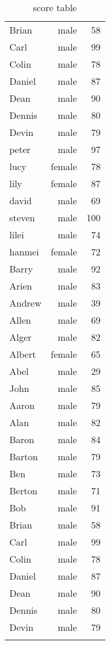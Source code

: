 \documentclass{article}
\begin{document}
\begin{longtable}{l r r}
Brian & male & 58\\
Carl & male & 99\\
Colin & male & 78\\
Daniel & male & 87\\
Dean & male & 90\\
Dennis & male & 80\\
Devin & male & 79\\
peter & male & 97\\
lucy & female & 78\\
lily & female & 87\\
david & male & 69\\
steven & male & 100\\
lilei & male & 74\\
hanmei & female & 72\\
Barry & male & 92\\
Arien & male & 83\\
Andrew &male & 39\\
Allen & male & 69\\
Alger & male & 82\\
Albert & female & 65\\
Abel & male & 29\\
John & male & 85\\
Aaron & male & 79\\
Alan & male & 82\\
Baron & male & 84\\
Barton & male & 79\\
Ben & male & 73\\
Berton & male & 71\\
Bob & male & 91\\
Brian & male & 58\\
Carl & male & 99\\
Colin & male & 78\\
Daniel & male & 87\\
Dean & male & 90\\
Dennis & male & 80\\
Devin & male & 79\\
\hline
\caption{score table}
\end{longtable}
\end{document}
